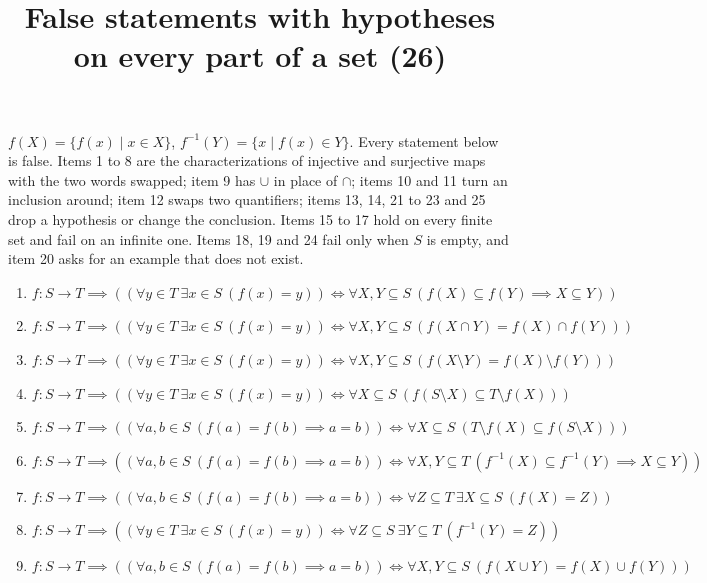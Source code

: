 \documentclass[11pt,a4paper]{article}
\title{False statements with hypotheses on every part of a set (26)}
\author{}
\date{}
\begin{document}
\maketitle
$f(X) = \{f(x) \mid x \in X\}$, $f^{-1}(Y) = \{x \mid f(x) \in Y\}$. Every statement below is false. Items 1 to 8 are the characterizations of injective and surjective maps with the two words swapped; item 9 has $\cup$ in place of $\cap$; items 10 and 11 turn an inclusion around; item 12 swaps two quantifiers; items 13, 14, 21 to 23 and 25 drop a hypothesis or change the conclusion. Items 15 to 17 hold on every finite set and fail on an infinite one. Items 18, 19 and 24 fail only when $S$ is empty, and item 20 asks for an example that does not exist.

\begin{enumerate}
\item $\displaystyle f \colon S \to T \implies ((\forall y \in T\ \exists x \in S\ (f(x) = y)) \iff \forall X, Y \subseteq S\ (f(X) \subseteq f(Y) \implies X \subseteq Y))$
\item $\displaystyle f \colon S \to T \implies ((\forall y \in T\ \exists x \in S\ (f(x) = y)) \iff \forall X, Y \subseteq S\ (f(X \cap Y) = f(X) \cap f(Y)))$
\item $\displaystyle f \colon S \to T \implies ((\forall y \in T\ \exists x \in S\ (f(x) = y)) \iff \forall X, Y \subseteq S\ (f(X \setminus Y) = f(X) \setminus f(Y)))$
\item $\displaystyle f \colon S \to T \implies ((\forall y \in T\ \exists x \in S\ (f(x) = y)) \iff \forall X \subseteq S\ (f(S \setminus X) \subseteq T \setminus f(X)))$
\item $\displaystyle f \colon S \to T \implies ((\forall a, b \in S\ (f(a) = f(b) \implies a = b)) \iff \forall X \subseteq S\ (T \setminus f(X) \subseteq f(S \setminus X)))$
\item $\displaystyle f \colon S \to T \implies ((\forall a, b \in S\ (f(a) = f(b) \implies a = b)) \iff \forall X, Y \subseteq T\ (f^{-1}(X) \subseteq f^{-1}(Y) \implies X \subseteq Y))$
\item $\displaystyle f \colon S \to T \implies ((\forall a, b \in S\ (f(a) = f(b) \implies a = b)) \iff \forall Z \subseteq T\ \exists X \subseteq S\ (f(X) = Z))$
\item $\displaystyle f \colon S \to T \implies ((\forall y \in T\ \exists x \in S\ (f(x) = y)) \iff \forall Z \subseteq S\ \exists Y \subseteq T\ (f^{-1}(Y) = Z))$
\item $\displaystyle f \colon S \to T \implies ((\forall a, b \in S\ (f(a) = f(b) \implies a = b)) \iff \forall X, Y \subseteq S\ (f(X \cup Y) = f(X) \cup f(Y)))$

\end{enumerate}
\end{document}
